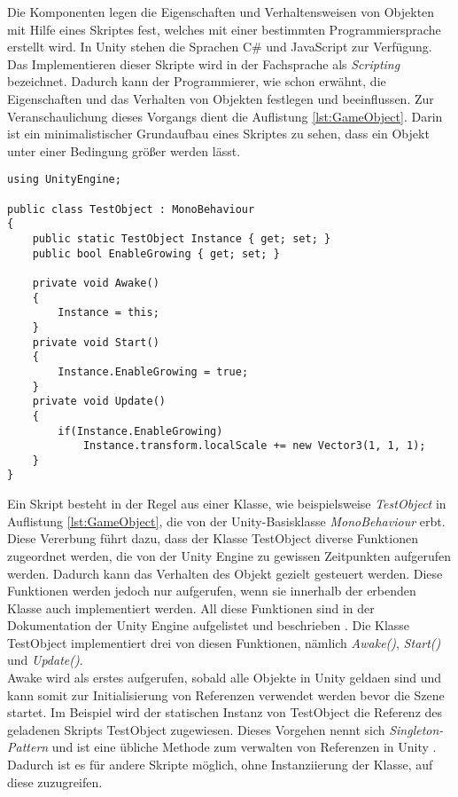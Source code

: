 Die Komponenten legen die Eigenschaften und Verhaltensweisen von Objekten mit Hilfe eines Skriptes fest, welches mit einer bestimmten Programmiersprache erstellt wird. In Unity stehen die Sprachen C\# und JavaScript zur Verfügung. Das Implementieren dieser Skripte wird in der Fachsprache als \textit{Scripting} bezeichnet. Dadurch kann der Programmierer, wie schon erwähnt, die Eigenschaften und das Verhalten von Objekten festlegen und beeinflussen. Zur Veranschaulichung dieses Vorgangs dient die Auflistung \ref{lst:GameObject}. Darin ist ein minimalistischer Grundaufbau eines Skriptes zu sehen, dass ein Objekt unter einer Bedingung größer werden lässt.\\

\begin{lstlisting}[caption={Grundaufbei eines Gameobjects in Unity}, captionpos=t, label=lst:GameObject]
using UnityEngine;

public class TestObject : MonoBehaviour
{
    public static TestObject Instance { get; set; }
    public bool EnableGrowing { get; set; }

    private void Awake()
    {
        Instance = this;
    }
    private void Start()
    {
        Instance.EnableGrowing = true;
    }
    private void Update()
    {
    	if(Instance.EnableGrowing)
        	Instance.transform.localScale += new Vector3(1, 1, 1);
    }
}
\end{lstlisting}
\quad


Ein Skript besteht in der Regel aus einer Klasse, wie beispielsweise \textit{TestObject} in Auflistung \ref{lst:GameObject}, die von der Unity-Basisklasse \textit{MonoBehaviour} erbt. Diese Vererbung führt dazu, dass der Klasse TestObject diverse Funktionen zugeordnet werden, die von der Unity Engine zu gewissen Zeitpunkten aufgerufen werden. Dadurch kann das Verhalten des Objekt gezielt gesteuert werden. Diese Funktionen werden jedoch nur aufgerufen, wenn sie innerhalb der erbenden Klasse auch implementiert werden. All diese Funktionen sind in der Dokumentation der Unity Engine aufgelistet und beschrieben \cite{bib:MonoBehaviour}. Die Klasse TestObject implementiert drei von diesen Funktionen, nämlich \textit{Awake()}, \textit{Start()} und \textit{Update()}.\\

Awake wird als erstes aufgerufen, sobald alle Objekte in Unity geldaen sind und kann somit zur Initialisierung von Referenzen verwendet werden bevor die Szene startet. Im Beispiel wird der statischen Instanz von TestObject die Referenz des geladenen Skripts TestObject zugewiesen. Dieses Vorgehen nennt sich \textit{Singleton-Pattern} und ist eine übliche Methode zum verwalten von Referenzen in Unity \cite{bib:Singleton}. Dadurch ist es für andere Skripte möglich, ohne Instanziierung der Klasse, auf diese zuzugreifen.

